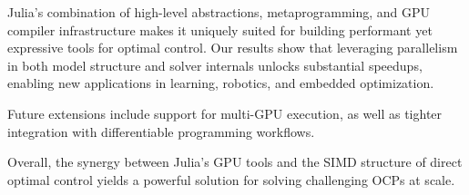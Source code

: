 \documentclass[twoside,leqno,twocolumn]{article}
\begin{document}
Julia’s combination of high-level abstractions, metaprogramming, and GPU compiler infrastructure makes it uniquely suited for building performant yet expressive tools for optimal control.  
Our results show that leveraging parallelism in both model structure and solver internals unlocks substantial speedups, enabling new applications in learning, robotics, and embedded optimization.


Future extensions include support for multi-GPU execution, as well as tighter integration with differentiable programming workflows.

Overall, the synergy between Julia’s GPU tools and the SIMD structure of direct optimal control yields a powerful solution for solving challenging OCPs at scale.


\small
% 


\end{document}
